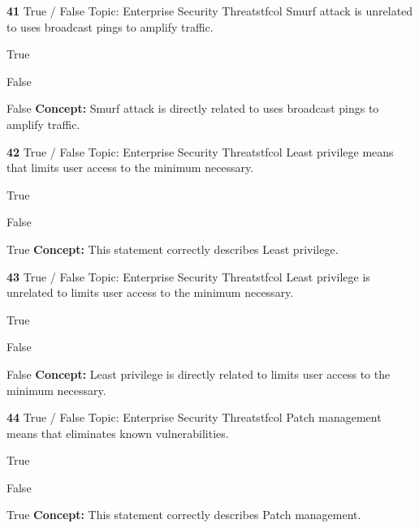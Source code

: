 \documentclass[10pt,a4paper]{article}
\begin{document}
\begin{qcard}{\color{white}\textbf{41} \hfill \small True / False \textbar{} Topic: Enterprise Security Threats}{tfcol}
Smurf attack is unrelated to uses broadcast pings to amplify traffic.

\begin{qoptions}
\item True
\item False
\end{qoptions}
\begin{explainbox}{False}
\textbf{Concept:} Smurf attack is directly related to uses broadcast pings to amplify traffic.
\end{explainbox}
\end{qcard}

\begin{qcard}{\color{white}\textbf{42} \hfill \small True / False \textbar{} Topic: Enterprise Security Threats}{tfcol}
Least privilege means that limits user access to the minimum necessary.

\begin{qoptions}
\item True
\item False
\end{qoptions}
\begin{explainbox}{True}
\textbf{Concept:} This statement correctly describes Least privilege.
\end{explainbox}
\end{qcard}

\begin{qcard}{\color{white}\textbf{43} \hfill \small True / False \textbar{} Topic: Enterprise Security Threats}{tfcol}
Least privilege is unrelated to limits user access to the minimum necessary.

\begin{qoptions}
\item True
\item False
\end{qoptions}
\begin{explainbox}{False}
\textbf{Concept:} Least privilege is directly related to limits user access to the minimum necessary.
\end{explainbox}
\end{qcard}

\begin{qcard}{\color{white}\textbf{44} \hfill \small True / False \textbar{} Topic: Enterprise Security Threats}{tfcol}
Patch management means that eliminates known vulnerabilities.

\begin{qoptions}
\item True
\item False
\end{qoptions}
\begin{explainbox}{True}
\textbf{Concept:} This statement correctly describes Patch management.
\end{explainbox}
\end{qcard}
\end{document}
